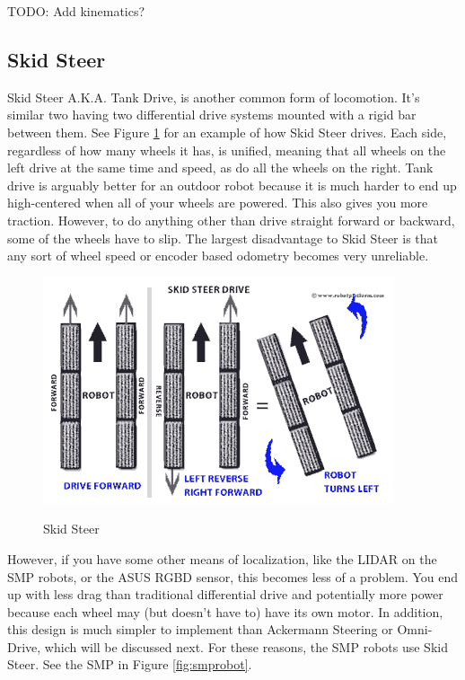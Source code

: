 TODO: Add kinematics?

\subsection{Skid Steer}

Skid Steer A.K.A. Tank Drive, is another common form of locomotion. It's similar two having two differential drive systems mounted with a rigid bar between them. See Figure \ref{fig:skid_steer_drive} for an example of how Skid Steer drives. Each side, regardless of how many wheels it has, is unified, meaning that all wheels on the left drive at the same time and speed, as do all the wheels on the right. Tank drive is arguably better for an outdoor robot because it is much harder to end up high-centered when all of your wheels are powered. This also gives you more traction. However, to do anything other than drive straight forward or backward, some of the wheels have to slip. The largest disadvantage to Skid Steer is that any sort of wheel speed or encoder based odometry becomes very unreliable.

\begin{figure}[h]
\centering
\includegraphics[scale=0.6]{skid_steer_drive.png}
\label{fig:skid_steer_drive}
\caption{Skid Steer}
\end{figure} 

However, if you have some other means of localization, like the LIDAR on the SMP robots, or the ASUS RGBD sensor, this becomes less of a problem. You end up with less drag than traditional differential drive and potentially more power because each wheel may (but doesn't have to) have its own motor. In addition, this design is much simpler to implement than Ackermann Steering or Omni-Drive, which will be discussed next. For these reasons, the SMP robots use Skid Steer. See the SMP in Figure \ref{fig:smprobot}.

